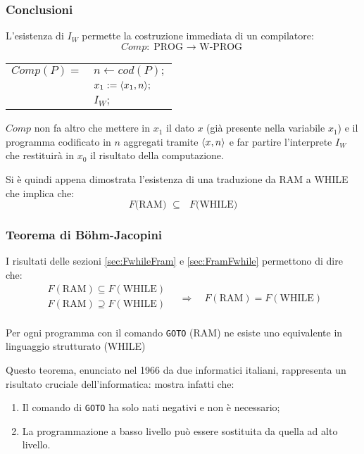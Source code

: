 \subsubsection*{Conclusioni}
L'esistenza di $I_W$ permette la costruzione immediata di un compilatore:
$$ Comp:\text{PROG\ $\to$ W-PROG} $$

\renewcommand{\arraystretch}{1.25}
\begin{center}
\begin{tabular}{r|l|} \cline{2-2}
 $Comp(P)=$ & $n\leftarrow cod(P);$\\
            & $x_1 := \langle x_1,n\rangle;$\\
            & $I_W;$ \\ \cline{2-2}
\end{tabular}
\end{center}\vspace{.5cm}

$Comp$ non fa altro che mettere in $x_1$ il dato $x$ (già presente nella variabile $x_1$) e 
il programma codificato in $n$ aggregati tramite $\langle x,n\rangle$ e far partire l'interprete 
$I_W$ che restituirà in $x_0$ il risultato della computazione.

Si è quindi appena dimostrata l'esistenza di una traduzione da RAM a WHILE che implica che:
$$ \text{$F$(RAM) $\subseteq$ $F$(WHILE)} $$

\subsubsection{Teorema di Böhm-Jacopini}
I risultati delle sezioni \ref{sec:FwhileFram} e \ref{sec:FramFwhile} permettono di dire
che:
$$ \begin{matrix}
    F(\text{RAM})\subseteq F(\text{WHILE}) \\
    F(\text{RAM})\supseteq F(\text{WHILE}) \\
\end{matrix} \quad \Rightarrow \quad
 F(\text{RAM})=F(\text{WHILE}) $$

\begin{theorem}
    Per ogni programma con il comando \texttt{GOTO} (RAM) ne esiste uno equivalente in
    linguaggio strutturato (WHILE)
\end{theorem}

Questo teorema, enunciato nel 1966 da due informatici italiani, rappresenta un risultato
cruciale dell'informatica: mostra infatti che:
\begin{enumerate}
    \item Il comando di \texttt{GOTO} ha solo nati negativi e non è necessario;
    \item La programmazione a basso livello può essere sostituita da quella ad alto
        livello.
\end{enumerate}

